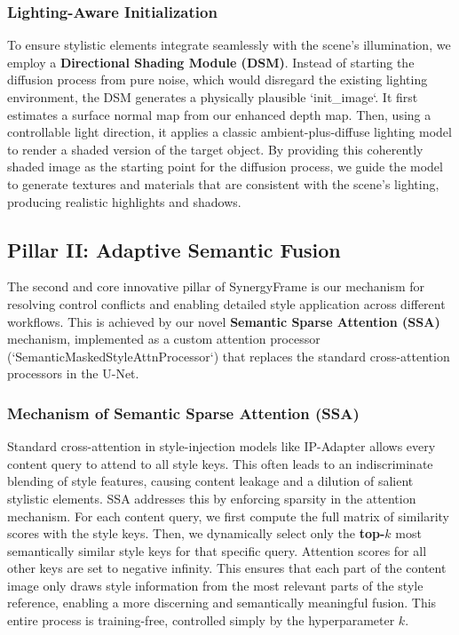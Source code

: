\documentclass[letterpaper]{article} %
\begin{document}
\subsubsection{Lighting-Aware Initialization}
To ensure stylistic elements integrate seamlessly with the scene's illumination, we employ a \textbf{Directional Shading Module (DSM)}. Instead of starting the diffusion process from pure noise, which would disregard the existing lighting environment, the DSM generates a physically plausible `init_image`. It first estimates a surface normal map from our enhanced depth map. Then, using a controllable light direction, it applies a classic ambient-plus-diffuse lighting model to render a shaded version of the target object. By providing this coherently shaded image as the starting point for the diffusion process, we guide the model to generate textures and materials that are consistent with the scene's lighting, producing realistic highlights and shadows.

\subsection{Pillar II: Adaptive Semantic Fusion}
\label{sec:fusion}

The second and core innovative pillar of SynergyFrame is our mechanism for resolving control conflicts and enabling detailed style application across different workflows. This is achieved by our novel \textbf{Semantic Sparse Attention (SSA)} mechanism, implemented as a custom attention processor (`SemanticMaskedStyleAttnProcessor`) that replaces the standard cross-attention processors in the U-Net.

\subsubsection{Mechanism of Semantic Sparse Attention (SSA)}
Standard cross-attention in style-injection models like IP-Adapter allows every content query to attend to all style keys. This often leads to an indiscriminate blending of style features, causing content leakage and a dilution of salient stylistic elements. SSA addresses this by enforcing sparsity in the attention mechanism. For each content query, we first compute the full matrix of similarity scores with the style keys. Then, we dynamically select only the \textbf{top-$k$} most semantically similar style keys for that specific query. Attention scores for all other keys are set to negative infinity. This ensures that each part of the content image only draws style information from the most relevant parts of the style reference, enabling a more discerning and semantically meaningful fusion. This entire process is training-free, controlled simply by the hyperparameter $k$.
\end{document}
